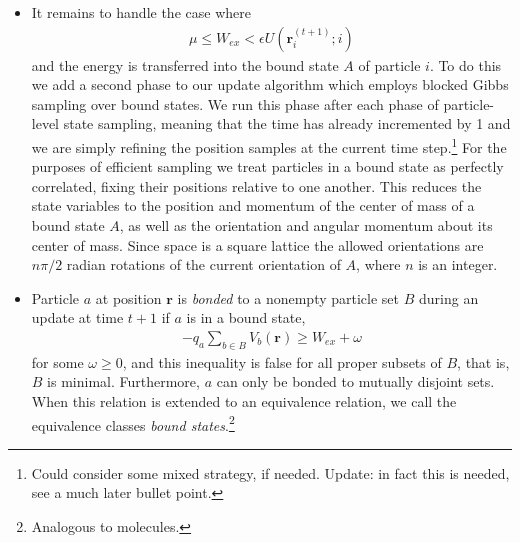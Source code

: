\documentclass[12pt,letterpaper]{article}
\newcommand{\mb}{\mathbf}
\begin{document}
\begin{itemize}
\begin{align*}
\max\{K_{1} - K_{1}(\mb{n} \cdot \mb{s}), 0\}
\end{align*}
to the corresponding excess work $W_{ex}$. It is also necessary to update the velocity bound; we add
\begin{align*}
\Delta t\sqrt{2K_{1} \over m_{a}}
\end{align*}
to the distance the particle may travel.
\item It remains to handle the case where
\begin{align*}
\mu \leqslant W_{ex} < \epsilon U(\mb{r}_{i}^{(t+1)}; i)
\end{align*}
and the energy is transferred into the bound state $A$ of particle $i$. To do this we add a second phase to our update algorithm which employs blocked Gibbs sampling over bound states. We run this phase after each phase of particle-level state sampling, meaning that the time has already incremented by 1 and we are simply refining the position samples at the current time step.\footnote{Could consider some mixed strategy, if needed. Update: in fact this is needed, see a much later bullet point.} For the purposes of efficient sampling we treat particles in a bound state as perfectly correlated, fixing their positions relative to one another. This reduces the state variables to the position and momentum of the center of mass of a bound state $A$, as well as the orientation and angular momentum about its center of mass. Since space is a square lattice the allowed orientations are $n\pi/2$ radian rotations of the current orientation of $A$, where $n$ is an integer.
\item Particle $a$ at position $\mb{r}$ is {\em bonded} to a nonempty particle set $B$ during an update at time $t+1$ if $a$ is in a bound state,
\begin{align*}
-q_{a}\sum_{b \in B}V_{b}(\mb{r}) \geqslant W_{ex} + \omega  %
\end{align*}
for some $\omega \geqslant 0$, and this inequality is false for all proper subsets of $B$, that is, $B$ is minimal. Furthermore,  $a$ can only be bonded to mutually disjoint sets. When this relation is extended to an equivalence relation, we call the equivalence classes {\em bound states}.\footnote{Analogous to molecules.}

\end{itemize}
\end{document}
